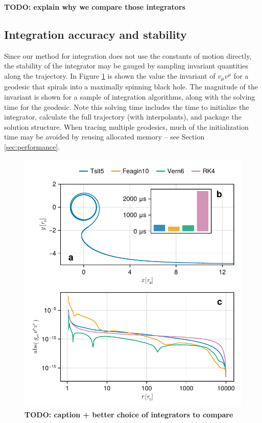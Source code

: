 \documentclass[fleqn,usenatbib]{mnras}
\newcommand{\todo}[1]{{\noindent \bf \color{red} TODO: #1}}
\begin{document}
\todo{explain why we compare those integrators}

\subsection{Integration accuracy and stability}

Since our method for integration does not use the constants of motion directly, the stability of the integrator may be gauged by sampling invariant quantities along the trajectory. In Figure \ref{fig:dot-stability} is shown the value the invariant of $v_\mu v^\mu$ for a geodesic that spirals into a maximally spinning black hole. The magnitude of the invariant is shown for a sample of integration algorithms, along with the solving time for the geodesic. Note this solving time includes the time to initialize the integrator, calculate the full trajectory (with interpolants), and package the solution structure. When tracing multiple geodesics, much of the initialization time may be avoided by reusing allocated memory -- see Section \ref{sec:performance}.

\begin{figure}
	\centering
	\includegraphics[width=0.95\linewidth]{figures/stability.conservation.pdf}
	\caption{\todo{caption + better choice of integrators to compare}}
	\label{fig:dot-stability}
\end{figure}
\end{document}
